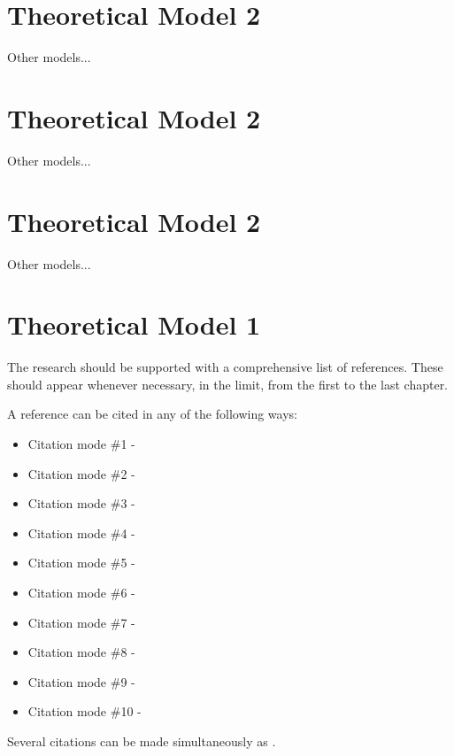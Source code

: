 \section{Theoretical Model 2}
\label{section:theory2}

Other models...

\section{Theoretical Model 2}
\label{section:theory2}

Other models...


\section{Theoretical Model 2}
\label{section:theory2}

Other models...


\section{Theoretical Model 1}
\label{section:theory1}

The research should be supported with a comprehensive list of references.
These should appear whenever necessary, in the limit, from the first to the last chapter.

A reference can be cited in any of the following ways:
%
\begin{itemize}
  \item Citation mode \#1 - \quad \cite{jameson:adjointns}
  \item Citation mode \#2 - \quad \citet{jameson:adjointns}
  \item Citation mode \#3 - \quad \citep{jameson:adjointns}
  \item Citation mode \#4 - \quad \citet*{jameson:adjointns}
  \item Citation mode \#5 - \quad \citep*{jameson:adjointns}
  \item Citation mode \#6 - \quad \citealt{jameson:adjointns}
  \item Citation mode \#7 - \quad \citealp{jameson:adjointns}
  \item Citation mode \#8 - \quad \citeauthor{jameson:adjointns}
  \item Citation mode \#9 - \quad \citeyear{jameson:adjointns}
  \item Citation mode \#10 - \quad \citeyearpar{jameson:adjointns}
\end{itemize}
%
Several citations can be made simultaneously as \citep{nocedal:opt,marta:ijcfd}. \\

